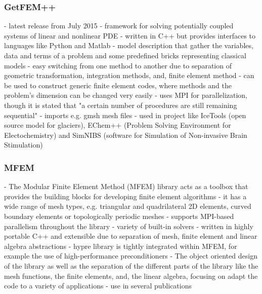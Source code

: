 \documentclass[11pt,twoside]{scrartcl}
\begin{document}
  \subsubsection{GetFEM++}
  - latest release from July 2015
  - framework for solving potentially coupled systems of linear and nonlinear PDE\newline
  - written in C++ but provides interfaces to languages like Python and Matlab\newline
  - model description that gather the variables, data and terms of a problem and some predefined bricks representing classical models\newline
  - easy switching from one method to another due to separation of geometric transformation, integration methods, and, finite element method\newline
  - can be used to construct generic finite element codes, where methods and the problem's dimension can be changed very easily\newline
  - uses MPI for parallelization, though it is stated that "a certain number of procedures are still remaining sequential" \cite{getfemppMPI}
  - imports e.g. gmsh mesh files\newline
  - used in project like IceTools \cite{icetools} (open source model for glaciers), EChem++ \cite{echempp} (Problem Solving Environment for Electochemistry) and SimNIBS \cite{simnibs} (software for Simulation of Non-invasive Brain Stimulation)
  \subsubsection{MFEM}\cite{mfem}
  - The Modular Finite Element Method (MFEM) library acts as a toolbox that provides the building blocks for developing finite element algorithms\newline
  - it has a wide range of mesh types, e.g. triangular and quadrilateral 2D elements, curved boundary elements or topologically periodic meshes\newline
  - supports MPI-based parallelism throughout the library\newline
  - variety of built-in solvers\newline
  - written in highly portable C++ and extensible due to separation of mesh, finite element and linear algebra abstractions\newline
  - hypre library is tightly integrated within MFEM, for example the use of high-performance preconditioners
  - The object oriented design of the library as well as the separation of the different parts of the library like the mesh functions, the finite elements, and, the linear algebra, focusing on adapt the code to a variety of applications
  - use in several publications \cite{mfemPubs}
\end{document}
